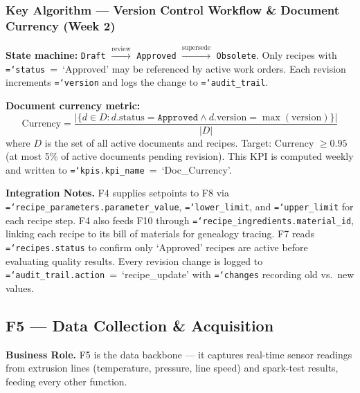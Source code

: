 \documentclass[11pt]{article}
\newcommand{\tfield}[1]{\texttt{\hyphenchar\font=`\-\relax #1}}
\begin{document}
\subsubsection*{Key Algorithm --- Version Control Workflow \& Document Currency (Week 2)}

\textbf{State machine:} \texttt{Draft} $\xrightarrow{\text{review}}$ \texttt{Approved} $\xrightarrow{\text{supersede}}$ \texttt{Obsolete}.  Only recipes with \tfield{status}~=~`Approved' may be referenced by active work orders.  Each revision increments \tfield{version} and logs the change to \tfield{audit\_trail}.

\textbf{Document currency metric:}
\[
\text{Currency} = \frac{|\{d \in D : d.\text{status} = \texttt{Approved} \wedge d.\text{version} = \max(\text{version})\}|}{|D|}
\]
where $D$ is the set of all active documents and recipes.  Target: Currency $\geq 0.95$ (at most 5\% of active documents pending revision).  This KPI is computed weekly and written to \tfield{kpis.kpi\_name}~=~`Doc\_Currency'.

\textbf{Integration Notes.}
F4 supplies setpoints to F8 via \tfield{recipe\_parameters.parameter\_value}, \tfield{lower\_limit}, and \tfield{upper\_limit} for each recipe step.  F4 also feeds F10 through \tfield{recipe\_ingredients.material\_id}, linking each recipe to its bill of materials for genealogy tracing.  F7 reads \tfield{recipes.status} to confirm only `Approved' recipes are active before evaluating quality results.  Every revision change is logged to \tfield{audit\_trail.action}~=~`recipe\_update' with \tfield{changes} recording old vs.\ new values.

\subsection{F5 --- Data Collection \& Acquisition}

\textbf{Business Role.}
F5 is the data backbone --- it captures real-time sensor readings from extrusion lines (temperature, pressure, line speed) and spark-test results, feeding every other function.
\end{document}
